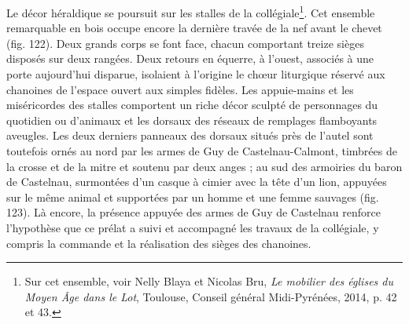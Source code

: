 \documentclass[12pt,twoside,openany]{book}
\begin{document}
Le décor héraldique se poursuit sur les stalles de la collégiale\footnote{Sur cet ensemble, voir Nelly Blaya et Nicolas Bru, \textit{Le mobilier des églises du Moyen Âge dans le Lot}, Toulouse, Conseil général Midi-Pyrénées, 2014, p. 42 et 43.}. Cet ensemble remarquable en bois occupe encore la dernière travée de la nef avant le chevet (fig. 122). Deux grands corps se font face, chacun comportant treize sièges disposés sur deux rangées. Deux retours en équerre, à l’ouest, associés à une porte aujourd’hui disparue, isolaient à l’origine le chœur liturgique réservé aux chanoines de l’espace ouvert aux simples fidèles. Les appuie-mains et les miséricordes des stalles comportent un riche décor sculpté de personnages du quotidien ou d’animaux et les dorsaux des réseaux de remplages flamboyants aveugles. Les deux derniers panneaux des dorsaux situés près de l’autel sont toutefois ornés au nord par les armes de Guy de Castelnau-Calmont, timbrées de la crosse et de la mitre et soutenu par deux anges ; au sud des armoiries du baron de Castelnau, surmontées d’un casque à cimier avec la tête d’un lion, appuyées sur le même animal et supportées par un homme et une femme sauvages (fig. 123). Là encore, la présence appuyée des armes de Guy de Castelnau renforce l’hypothèse que ce prélat a suivi et accompagné les travaux de la collégiale, y compris la commande et la réalisation des sièges des chanoines.
\end{document}
